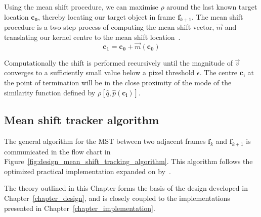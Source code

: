 Using the mean shift procedure, we can maximise $\rho$ around the
last known target location $\mathbf{c_0}$, thereby locating our target object in frame $\mathbf{f}_{k+1}$. 
The mean shift procedure is a two step process of computing the mean shift
vector, $\vec{m}$ and translating our kernel centre to the mean shift location~\cite{Comaniciu2002}. 
\[\mathbf{c_1} = \mathbf{c_0} + \vec{m}(\mathbf{c_0})\]

Computationally the shift is performed recursively until the magnitude of $\vec{v}$ converges
to a sufficiently small value below a pixel threshold $\epsilon$. The centre
$\mathbf{c_i}$ at the point of termination will be in the close proximity of the
mode of the similarity function defined by $\rho[\hat{q},\hat{p}(\mathbf{c_i})]$.

\subsection{Mean shift tracker algorithm}\label{theoretical_framework_mean_shift_algorithm}
The general algorithm for the MST between two adjacent frames $\mathbf{f}_k$ and
$\mathbf{f}_{k+1}$ is communicated in the flow chart in
Figure~\ref{fig:design_mean_shift_tracking_algorithm}. This algorithm follows
the optimized practical implementation expanded on by~\cite{Comaniciu2003}. 


The theory outlined in this Chapter forms the basis of the design developed in
Chapter~\ref{chapter_design}, and is closely coupled to the implementations
presented in Chapter~\ref{chapter_implementation}.

